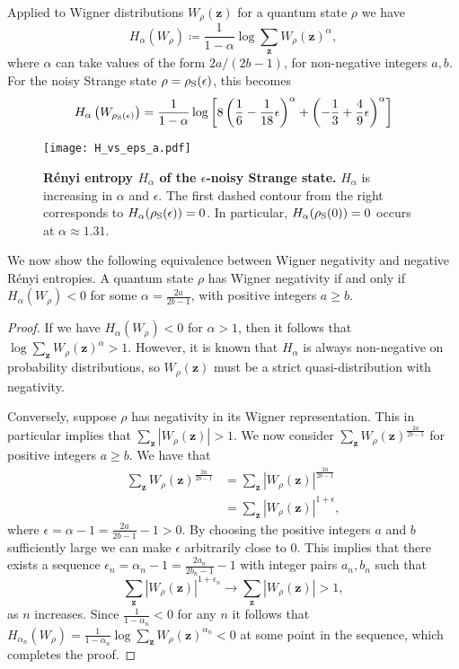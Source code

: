 \documentclass[
twocolumn,
superscriptaddress
]{revtex4-1}
\newenvironment{customthm}[1]
  {\renewcommand\theinnercustomthm{#1}\innercustomthm}
  {\endinnercustomthm}
\def\z{\boldsymbol{z}}
\begin{document}
Applied to Wigner distributions $W_\rho (\z)$ for a quantum state $\rho$ we have
\begin{equation}
	H_\alpha(W_\rho) \coloneqq \frac{1}{1-\alpha} \log \sum_{\z} W_{\rho}(\z)^\alpha,
\end{equation}
where $\alpha$ can take values of the form $2a / (2b-1)$, for non-negative integers $a,b$. For the noisy Strange state $\rho = \rho_{\rm{S}}(\epsilon)$, this becomes
\begin{align}
	H_{\alpha}\left(W_{\rho_{\rm{S}}(\epsilon)}\right) = \frac{1}{1-\alpha}\log \left[ 8\left( \frac{1}{6} - \frac{1}{18}\epsilon \right)^\alpha + \left(-\frac{1}{3} + \frac{4}{9}\epsilon \right)^\alpha \right] \nonumber\\
\end{align}
\begin{figure}[t!]
    \centering
    \texttt{[image: H\_vs\_eps\_a.pdf]}
    \caption{\textbf{R\'{e}nyi entropy $H_\alpha$ of the $\epsilon$-noisy Strange state.} $H_\alpha$ is increasing in $\alpha$ and $\epsilon$. The first dashed contour from the right corresponds to $H_\alpha(\rho_{\rm{S}}(\epsilon)) = 0$. In particular, $H_\alpha(\rho_{\rm{S}}(0)) = 0$ occurs at $\alpha \approx 1.31$.
    }
    \label{fig:H}
\end{figure}
We now show the following equivalence between Wigner negativity and negative R\'{e}nyi entropies.
\begin{customthm}{10}
	A quantum state $\rho$ has Wigner negativity if and only if $H_\alpha(W_\rho) < 0$ for some $\alpha =  \frac{2a}{2b-1}$, with positive integers $a \geq b$.
\end{customthm}
\begin{proof} 
If we have $H_\alpha (W_\rho) <0 $ for $\alpha >1$, then it follows that $\log \sum_{\z} W_\rho (\z)^\alpha > 1$. 
However, it is known that $H_\alpha$ is always non-negative on probability distributions, so $W_\rho(\z)$ must be a strict quasi-distribution with negativity.

Conversely, suppose $\rho$ has negativity in its Wigner representation. This in particular implies that $\sum_{\z} |W_\rho (\z)| >1$. We now consider $\sum_{\z} W_\rho (\z)^{\frac{2a}{2b-1}}$ for positive integers $a\ge b$. We have that
\begin{align}
\sum_{\z} W_\rho (\z)^{\frac{2a}{2b-1}} &= \sum_{\z} |W_\rho (\z)|^{\frac{2a}{2b-1}} \nonumber \\
&= \sum_{\z} |W_\rho (\z)|^{1+ \epsilon},
\end{align}
where $\epsilon = \alpha -1=\frac{2a}{2b-1} - 1 >0$. By choosing the positive integers $a$ and $b$ sufficiently large we can make $\epsilon$ arbitrarily close to $0$. This implies that there exists a sequence $\epsilon_n= \alpha_n-1 =\frac{2a_n}{2b_n-1} - 1$ with integer pairs $a_n, b_n$ such that
\begin{equation}
\sum_{\z} |W_\rho (\z)|^{1+ \epsilon_n} \rightarrow \sum_{\z} |W_\rho (\z)| >1,
\end{equation}
as $n$ increases.
Since $\frac{1}{1-\alpha_n} <0$ for any $n$ it follows that $H_{\alpha_n} (W_\rho) = \frac{1}{1-\alpha_n} \log \sum_{\z} W_\rho (\z)^{\alpha_n}  <0 $ at some point in the sequence, which completes the proof.
\end{proof}
\end{document}
